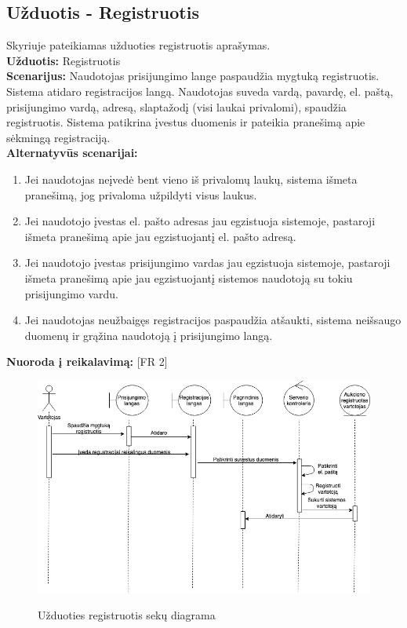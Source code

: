 \documentclass{VUMIFPSkursinis}
\begin{document}
	\subsection{Užduotis - Registruotis}
	Skyriuje pateikiamas užduoties registruotis aprašymas.\\
	\textbf{Užduotis:}  Registruotis \\
	\textbf{Scenarijus:} Naudotojas prisijungimo lange paspaudžia mygtuką registruotis. Sistema atidaro registracijos langą. Naudotojas suveda vardą, pavardę, el. paštą, prisijungimo vardą, adresą, slaptažodį (visi laukai privalomi), spaudžia registruotis. Sistema patikrina įvestus duomenis ir pateikia pranešimą apie sėkmingą registraciją.\\
	\textbf{Alternatyvūs scenarijai:}
	\begin{enumerate}
		\item Jei naudotojas neįvedė bent vieno iš privalomų laukų, sistema išmeta pranešimą, jog privaloma užpildyti visus laukus.
		\item Jei naudotojo įvestas el. pašto adresas jau egzistuoja sistemoje, pastaroji išmeta pranešimą apie jau egzistuojantį el. pašto adresą.
		\item Jei naudotojo įvestas prisijungimo vardas jau egzistuoja sistemoje, pastaroji išmeta pranešimą apie jau egzistuojantį sistemos naudotoją su tokiu prisijungimo vardu.
		\item Jei naudotojas neužbaigęs registracijos paspaudžia atšaukti, sistema neišsaugo duomenų ir grąžina naudotoją į prisijungimo langą.
	\end{enumerate}
	\textbf{Nuoroda į reikalavimą: } [FR 2]\\
	
	\begin{figure}[H]
		\centering
		\includegraphics[width=\linewidth]{img/registerSequence.png}
		\label{fig:registracija}
		\caption{Užduoties registruotis sekų diagrama}
	\end{figure}
\end{document}
